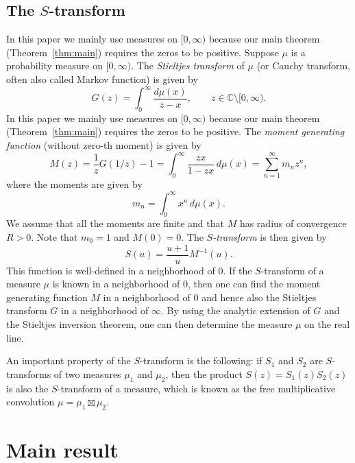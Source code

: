 \documentclass[12pt]{article}
\numberwithin{equation}{section}
\begin{document}
\subsection{The $S$-transform}
 In this paper we mainly use measures on $[0,\infty)$ because our main theorem (Theorem~\ref{thm:main}) requires the zeros to be positive.
Suppose $\mu$ is a probability measure on $[0,\infty)$.
The \textit{Stieltjes transform} of $\mu$ (or Cauchy transform, often also called Markov function) is given by
\[    G(z) = \int_0^\infty \frac{d\mu(x)}{z-x}, \qquad z \in \mathbb{C} \setminus [0,\infty). \]
In this paper we mainly use measures on $[0,\infty)$ because our main theorem (Theorem~\ref{thm:main}) requires the zeros to be positive.
The \textit{moment generating function} (without zero-th moment) is given by
\[    M(z) = \frac{1}{z} G(1/z) -1 = \int_0^\infty \frac{zx}{1-zx} \, d\mu(x) = \sum_{n=1}^\infty m_n z^n,  \]
where the moments are given by
\[     m_n = \int_0^\infty  x^n \, d\mu(x).  \]
We assume that all the moments are finite and that $M$ has radius of convergence $R > 0$. Note that $m_0=1$ and $M(0)=0$.
The \textit{$S$-transform} is then given by
\[     S(u) = \frac{u+1}{u} M^{-1}(u).  \]
This function is well-defined in a neighborhood of $0$.
If the $S$-transform of a measure $\mu$ is known in a neighborhood of $0$, then one can find the moment generating function $M$ in a neighborhood
of $0$ and hence also the Stieltjes transform $G$ in a neighborhood of $\infty$. By using the analytic extension of $G$ and the Stieltjes inversion theorem, one can then determine the measure $\mu$ on the real line.

An important property of the $S$-transform is the following: if $S_1$ and $S_2$ are $S$-transforms of two measures $\mu_1$ and $\mu_2$, then the product
$S(z)=S_1(z)S_2(z)$ is also the $S$-transform of a measure, which is known as the free multiplicative convolution $\mu = \mu_1 \boxtimes \mu_2$.


\section{Main result}
\end{document}
